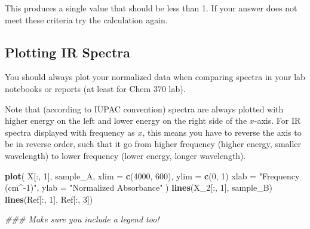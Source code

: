 \documentclass[]{tufte-book}
\newenvironment{Shaded}{}{}
\newcommand{\CommentTok}[1]{\textcolor[rgb]{0.38,0.63,0.69}{\textit{#1}}}
\newcommand{\DataTypeTok}[1]{\textcolor[rgb]{0.56,0.13,0.00}{#1}}
\newcommand{\DecValTok}[1]{\textcolor[rgb]{0.25,0.63,0.44}{#1}}
\newcommand{\KeywordTok}[1]{\textcolor[rgb]{0.00,0.44,0.13}{\textbf{#1}}}
\newcommand{\NormalTok}[1]{#1}
\newcommand{\OperatorTok}[1]{\textcolor[rgb]{0.40,0.40,0.40}{#1}}
\newcommand{\StringTok}[1]{\textcolor[rgb]{0.25,0.44,0.63}{#1}}
\begin{document}
This produces a single value that should be less than 1. If your answer does not meet these criteria try the calculation again.

\hypertarget{plotting-ir-spectra}{%
\subsection*{Plotting IR Spectra}\label{plotting-ir-spectra}}

You should always plot your normalized data when comparing spectra in your lab notebooks or reports (at least for Chem 370 lab).

Note that (according to IUPAC convention) spectra are always plotted with higher energy on the left and lower energy on the right side of the \(x\)-axis. For IR spectra displayed with frequency as \(x\), this means you have to reverse the axis to be in reverse order, such that it go from higher frequency (higher energy, smaller wavelength) to lower frequency (lower energy, longer wavelength).

\begin{Shaded}
\begin{Highlighting}[]
\KeywordTok{plot}\NormalTok{(}
\NormalTok{  X[}\OperatorTok{:}\NormalTok{, }\DecValTok{1}\NormalTok{], sample_A, }
  \DataTypeTok{xlim =} \KeywordTok{c}\NormalTok{(}\DecValTok{4000}\NormalTok{, }\DecValTok{600}\NormalTok{), }\DataTypeTok{ylim =} \KeywordTok{c}\NormalTok{(}\DecValTok{0}\NormalTok{, }\DecValTok{1}\NormalTok{)}
  \DataTypeTok{xlab =} \StringTok{"Frequency (cm^-1)"}\NormalTok{, }\DataTypeTok{ylab =} \StringTok{"Normalized Absorbance"}
\NormalTok{)}
\KeywordTok{lines}\NormalTok{(X_}\DecValTok{2}\NormalTok{[}\OperatorTok{:}\NormalTok{, }\DecValTok{1}\NormalTok{], sample_B)}
\KeywordTok{lines}\NormalTok{(Ref[}\OperatorTok{:}\NormalTok{, }\DecValTok{1}\NormalTok{], Ref[}\OperatorTok{:}\NormalTok{, }\DecValTok{3}\NormalTok{])}

\CommentTok{### Make sure you include a legend too!}
\end{Highlighting}
\end{Shaded}
\end{document}
